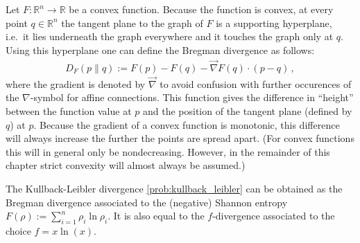     \begin{definition}\label{info:bregman_divergence}
        Let $F:\mathbb{R}^n\rightarrow\mathbb{R}$ be a convex function. Because the function is convex, at every point $q\in\mathbb{R}^n$ the tangent plane to the graph of $F$ is a supporting hyperplane, i.e.~it lies underneath the graph everywhere and it touches the graph only at $q$. Using this hyperplane one can define the Bregman divergence as follows:
        \begin{gather}
            D_F(p\|q) := F(p) - F(q) - \vec{\nabla}F(q)\cdot(p-q)\,,
        \end{gather}
        where the gradient is denoted by $\vec{\nabla}$ to avoid confusion with further occurences of the $\nabla$-symbol for affine connections. This function gives the difference in ``height'' between the function value at $p$ and the position of the tangent plane (defined by $q$) at $p$. Because the gradient of a convex function is monotonic, this difference will always increase the further the points are spread apart. (For convex functions this will in general only be nondecreasing. However, in the remainder of this chapter strict convexity will almost always be assumed.)
    \end{definition}
    \begin{example}
        The Kullback-Leibler divergence \ref{prob:kullback_leibler} can be obtained as the Bregman divergence associated to the (negative) Shannon entropy $F(\rho) := \sum_{i=1}^n\rho_i\ln\rho_i$. It is also equal to the $f$-divergence associated to the choice $f=x\ln(x)$.
    \end{example}

